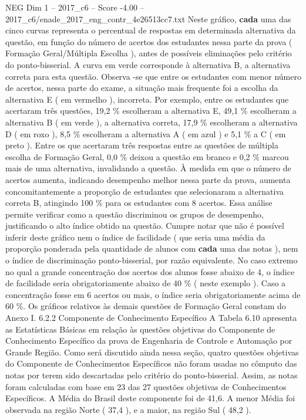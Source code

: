 \begin{textsample}{NEG Dim 1 – 2017\_c6 – Score -4.00 – 2017\_c6/enade\_2017\_eng\_contr\_4e26513cc7.txt}
Neste gráfico, \textbf{cada} uma das cinco curvas representa o percentual de respostas em determinada alternativa da questão, em função do número de acertos dos estudantes nessa parte da prova ( Formação Geral/Múltipla Escolha ), antes de possíveis eliminações pelo critério do ponto-bisserial.
A curva em verde corresponde à alternativa B, a alternativa correta para esta questão.
Observa -se que entre os estudantes com menor número de acertos, nessa parte do exame, a situação mais frequente foi a escolha da alternativa E ( em vermelho ), incorreta.
Por exemplo, entre os estudantes que acertaram três questões, 19,2 \% escolheram a alternativa E, 49,1 \% escolheram a alternativa B ( em verde ), a alternativa correta, 17,9 \% escolheram a alternativa D ( em roxo ), 8,5 \% escolheram a alternativa A ( em azul ) e 5,1 \% a C ( em preto ).
Entre os que acertaram três respostas entre as questões de múltipla escolha de Formação Geral, 0,0 \% deixou a questão em branco e 0,2 \% marcou mais de uma alternativa, invalidando a questão.
À medida em que o número de acertos aumenta, indicando desempenho melhor nessa parte da prova, aumenta concomitantemente a proporção de estudantes que selecionaram a alternativa correta B, atingindo 100 \% para os estudantes com 8 acertos.
Essa análise permite verificar como a questão discriminou os grupos de desempenho, justificando o alto índice obtido na questão.
Cumpre notar que não é possível inferir deste gráfico nem o índice de facilidade ( que seria uma média da proporção ponderada pela quantidade de alunos com \textbf{cada} uma das notas ), nem o índice de discriminação ponto-bisserial, por razão equivalente.
No caso extremo no qual a grande concentração dos acertos dos alunos fosse abaixo de 4, o índice de facilidade seria obrigatoriamente abaixo de 40 \% ( neste exemplo ).
Caso a concentração fosse em 6 acertos ou mais, o índice seria obrigatoriamente acima de 60 \%.
Os gráficos relativos às demais questões de Formação Geral constam do Anexo I. 6.2.2 Componente de Conhecimento Específico A Tabela 6.10 apresenta as Estatísticas Básicas em relação às questões objetivas do Componente de Conhecimento Específico da prova de Engenharia de Controle e Automação por Grande Região.
Como será discutido ainda nessa seção, quatro questões objetivas do Componente de Conhecimentos Específicos não foram usadas no cômputo das notas por terem sido descartadas pelo critério do ponto-bisserial.
Assim, as notas foram calculadas com base em 23 das 27 questões objetivas de Conhecimentos Específicos.
A Média do Brasil deste componente foi de 41,6.
A menor Média foi observada na região Norte ( 37,4 ), e a maior, na região Sul ( 48,2 ).

\end{textsample}
